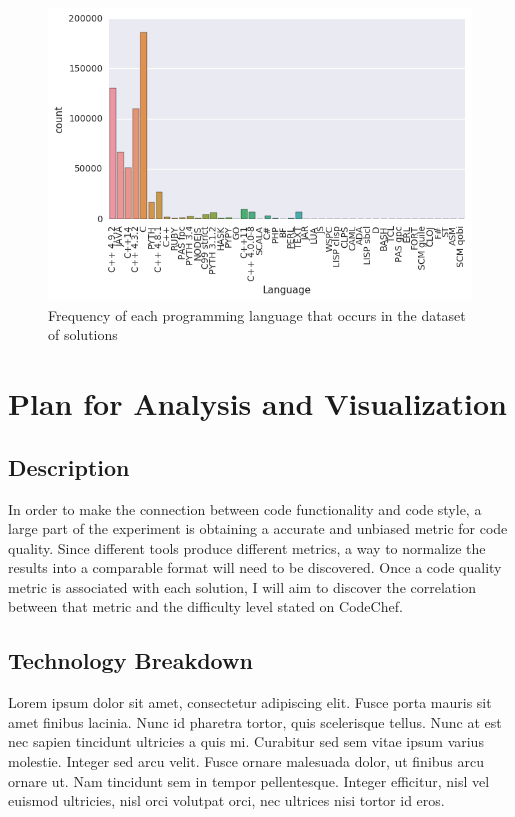 \documentclass{article}
\begin{document}
\begin{figure}[ht]
\vskip 0.2in
\begin{center}
\centerline{\includegraphics[width=\columnwidth]{images/languages.png}}
\caption{Frequency of each programming language that occurs in the dataset of solutions }
\label{languages}
\end{center}
\vskip -0.2in
\end{figure}

\citet{kagglekernal}

\section{Plan for Analysis and
Visualization}\label{plan-for-analysis-and-visualization}

\subsection{Description}\label{description}

In order to make the connection between code functionality and code
style, a large part of the experiment is obtaining a accurate and
unbiased metric for code quality. Since different tools produce
different metrics, a way to normalize the results into a comparable
format will need to be discovered. Once a code quality metric is
associated with each solution, I will aim to discover the correlation
between that metric and the difficulty level stated on CodeChef.

\subsection{Technology Breakdown}\label{technology-breakdown}

Lorem ipsum dolor sit amet, consectetur adipiscing elit. Fusce porta
mauris sit amet finibus lacinia. Nunc id pharetra tortor, quis
scelerisque tellus. Nunc at est nec sapien tincidunt ultricies a quis
mi. Curabitur sed sem vitae ipsum varius molestie. Integer sed arcu
velit. Fusce ornare malesuada dolor, ut finibus arcu ornare ut. Nam
tincidunt sem in tempor pellentesque. Integer efficitur, nisl vel
euismod ultricies, nisl orci volutpat orci, nec ultrices nisi tortor id
eros.



\end{document}

